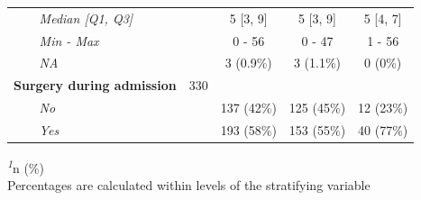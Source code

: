 \documentclass[
]{article}
\begin{document}
\begin{table}[t]
\begin{tabular*}{0.7\linewidth}{@{\extracolsep{\fill}}lcccc}
{\itshape     Median {[}Q1, Q3{]}} &  & 5 {[}3, 9{]} & 5 {[}3, 9{]} & 5 {[}4, 7{]} \\ 
{\itshape     Min - Max} &  & 0 - 56 & 0 - 47 & 1 - 56 \\ 
{\itshape     NA} &  & 3 (0.9\%) & 3 (1.1\%) & 0 (0\%) \\ 
{\bfseries Surgery during admission} & 330 &  &  &  \\ 
{\itshape     No} &  & 137 (42\%) & 125 (45\%) & 12 (23\%) \\ 
{\itshape     Yes} &  & 193 (58\%) & 153 (55\%) & 40 (77\%) \\ 
\bottomrule
\end{tabular*}
\begin{minipage}{\linewidth}
\textsuperscript{\textit{1}}n (\%)\\
Percentages are calculated within levels of the stratifying 
    variable\\
\end{minipage}
\end{table}
\end{document}
